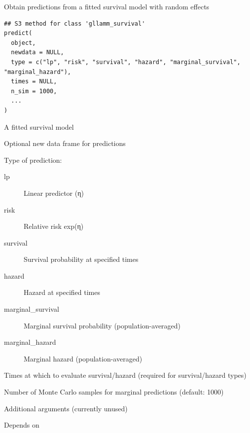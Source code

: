 \documentclass[a4paper]{book}
\begin{document}
%
\begin{Description}
Obtain predictions from a fitted survival model with random effects
\end{Description}
%
\begin{Usage}
\begin{verbatim}
## S3 method for class 'gllamm_survival'
predict(
  object,
  newdata = NULL,
  type = c("lp", "risk", "survival", "hazard", "marginal_survival", "marginal_hazard"),
  times = NULL,
  n_sim = 1000,
  ...
)
\end{verbatim}
\end{Usage}
%
\begin{Arguments}
\begin{ldescription}
\item[\code{object}] A fitted survival model

\item[\code{newdata}] Optional new data frame for predictions

\item[\code{type}] Type of prediction:
\begin{description}

\item[lp] Linear predictor (η)
\item[risk] Relative risk exp(η)
\item[survival] Survival probability at specified times
\item[hazard] Hazard at specified times
\item[marginal\_survival] Marginal survival probability (population-averaged)
\item[marginal\_hazard] Marginal hazard (population-averaged)

\end{description}


\item[\code{times}] Times at which to evaluate survival/hazard (required for survival/hazard types)

\item[\code{n\_sim}] Number of Monte Carlo samples for marginal predictions (default: 1000)

\item[\code{...}] Additional arguments (currently unused)
\end{ldescription}
\end{Arguments}
%
\begin{Value}
Depends on 
\end{Value}
\end{document}
